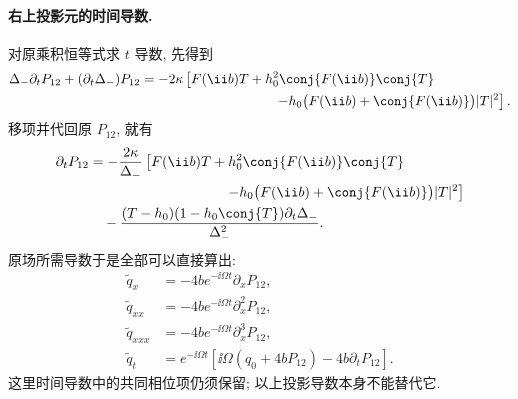 \paragraph{右上投影元的时间导数.}
对原乘积恒等式求 $t$ 导数, 先得到
\begin{align*}
\Delta_-\partial_tP_{12}
+(\partial_t\Delta_-)P_{12}
&=-2\kappa\left[
F(\ii b)T+h_0^2\conj{F(\ii b)}\conj{T}\right.\\
&\hspace{35mm}\left.
-h_0\bigl(F(\ii b)+\conj{F(\ii b)}\bigr)|T|^2
\right].
\end{align*}
移项并代回原 $P_{12}$, 就有
\begin{align*}
\partial_tP_{12}
&=-\dfrac{2\kappa}{\Delta_-}
\left[F(\ii b)T+h_0^2\conj{F(\ii b)}\conj{T}\right.\\
&\hspace{34mm}\left.
-h_0\bigl(F(\ii b)+\conj{F(\ii b)}\bigr)|T|^2\right]\\
&\quad-\dfrac{(T-h_0)(1-h_0\conj{T})
\partial_t\Delta_-}{\Delta_-^2}.
\end{align*}
原场所需导数于是全部可以直接算出:
\begin{align*}
\widetilde q_x
&=-4b e^{-\ii\Omega t}\partial_xP_{12},\\
\widetilde q_{xx}
&=-4b e^{-\ii\Omega t}\partial_x^2P_{12},\\
\widetilde q_{xxx}
&=-4b e^{-\ii\Omega t}\partial_x^3P_{12},\\
\widetilde q_t
&=e^{-\ii\Omega t}
\left[\ii\Omega(q_0+4bP_{12})-4b\partial_tP_{12}\right].
\end{align*}
这里时间导数中的共同相位项仍须保留; 以上投影导数本身不能替代它.


